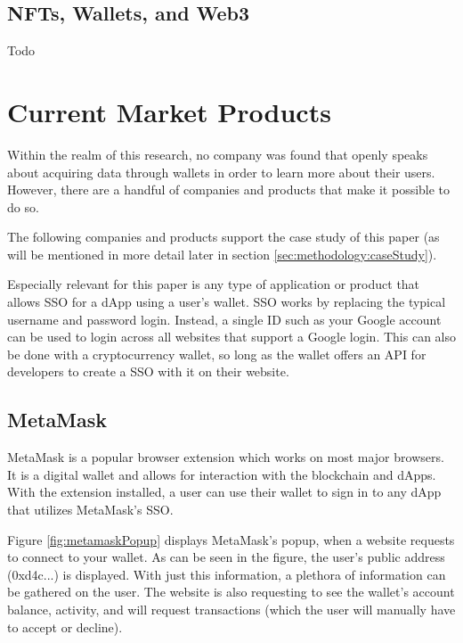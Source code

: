 \subsection{NFTs, Wallets, and Web3}
\label{sec:sota:nfts}
Todo



%
%
\section{Current Market Products}
\label{sec:sota:products}
Within the realm of this research, no company was found that openly speaks about acquiring data through wallets in order to learn more about their users. However, there are a handful of companies and products that make it possible to do so.

The following companies and products support the case study  of this paper (as will be mentioned in more detail later in section \ref{sec:methodology:caseStudy}).

Especially relevant for this paper is any type of application or product that allows SSO for a dApp using a user's wallet. SSO works by replacing the typical username and password login. Instead, a single ID such as your Google account can be used to login across all websites that support a Google login. This can also be done with a cryptocurrency wallet, so long as the wallet offers an API for developers to create a SSO with it on their website.

\subsection{MetaMask}
\label{sec:sota:metaMask}
MetaMask is a popular browser extension which works on most major browsers. It is a digital wallet and allows for interaction with the blockchain and dApps. With the extension installed, a user can use their wallet to sign in to any dApp that utilizes MetaMask's SSO. \cite{metaMask}

Figure \ref{fig:metamaskPopup} displays MetaMask's popup, when a website requests to connect to your wallet. As can be seen in the figure, the user's public address (0xd4c...) is displayed. With just this information, a plethora of information can be gathered on the user. The website is also requesting to see the wallet's account balance, activity, and will request transactions (which the user will manually have to accept or decline).

